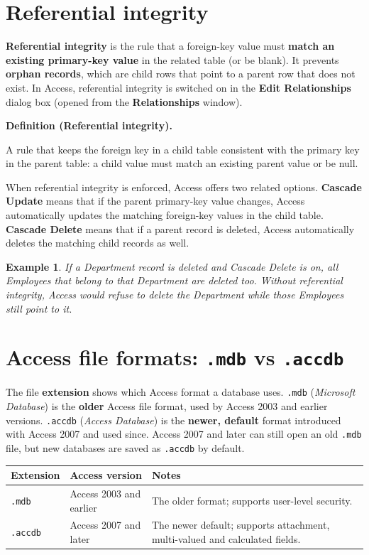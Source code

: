 \documentclass[11pt]{article}
\newtheorem{example}{Example}[section]
\newenvironment{definitionbox}[1]{%
  \par\noindent\textbf{Definition (#1).}\ \itshape
}{\par\vspace{0.3em}}
\begin{document}
\section{Referential integrity}
\textbf{Referential integrity} is the rule that a foreign-key value must
\textbf{match an existing primary-key value} in the related table (or be
blank). It prevents \textbf{orphan records}, which are child rows that point to
a parent row that does not exist. In Access, referential integrity is switched
on in the \textbf{Edit Relationships} dialog box (opened from the
\textbf{Relationships} window).

\begin{definitionbox}{Referential integrity}
A rule that keeps the foreign key in a child table consistent with the primary
key in the parent table: a child value must match an existing parent value or
be null.
\end{definitionbox}

When referential integrity is enforced, Access offers two related options.
\textbf{Cascade Update} means that if the parent primary-key value changes,
Access automatically updates the matching foreign-key values in the child
table. \textbf{Cascade Delete} means that if a parent record is deleted, Access
automatically deletes the matching child records as well.

\begin{example}
If a Department record is deleted and Cascade Delete is on, all Employees that
belong to that Department are deleted too. Without referential integrity,
Access would refuse to delete the Department while those Employees still point
to it.
\end{example}

\section{Access file formats: \texttt{.mdb} vs \texttt{.accdb}}
The file \textbf{extension} shows which Access format a database uses.
\texttt{.mdb} (\textit{Microsoft Database}) is the \textbf{older} Access file
format, used by Access 2003 and earlier versions. \texttt{.accdb}
(\textit{Access Database}) is the \textbf{newer, default} format introduced
with Access 2007 and used since. Access 2007 and later can still open an old
\texttt{.mdb} file, but new databases are saved as \texttt{.accdb} by default.

\begin{center}
\begin{tabular}{p{}p{}p{}}
\toprule
\textbf{Extension} & \textbf{Access version} & \textbf{Notes} \\
\midrule
\texttt{.mdb} & Access 2003 and earlier & The older format; supports user-level security. \\
\texttt{.accdb} & Access 2007 and later & The newer default; supports attachment, multi-valued and calculated fields. \\
\bottomrule
\end{tabular}
\end{center}
\end{document}
